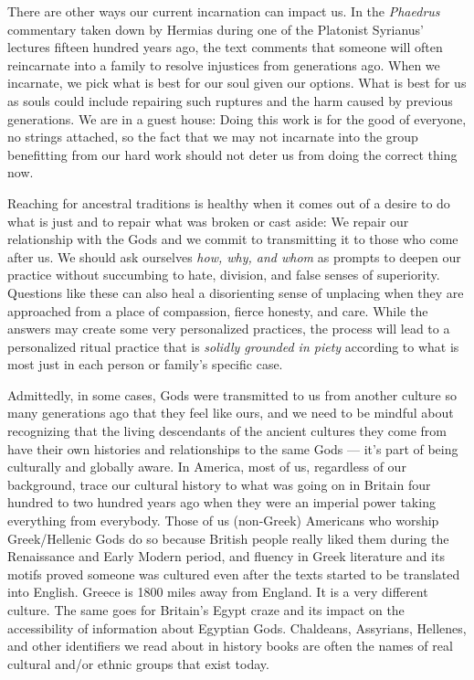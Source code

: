 \documentclass[
]{book}
\begin{document}
There are other ways our current incarnation can impact us. In the \emph{Phaedrus} commentary taken down by Hermias during one of the Platonist Syrianus' lectures fifteen hundred years ago, the text comments that someone will often reincarnate into a family to resolve injustices from generations ago. When we incarnate, we pick what is best for our soul given our options. What is best for us as souls could include repairing such ruptures and the harm caused by previous generations. We are in a guest house: Doing this work is for the good of everyone, no strings attached, so the fact that we may not incarnate into the group benefitting from our hard work should not deter us from doing the correct thing now.

Reaching for ancestral traditions is healthy when it comes out of a desire to do what is just and to repair what was broken or cast aside: We repair our relationship with the Gods and we commit to transmitting it to those who come after us. We should ask ourselves \emph{how, why, and whom} as prompts to deepen our practice without succumbing to hate, division, and false senses of superiority. Questions like these can also heal a disorienting sense of unplacing when they are approached from a place of compassion, fierce honesty, and care. While the answers may create some very personalized practices, the process will lead to a personalized ritual practice that is \emph{solidly grounded in piety} according to what is most just in each person or family's specific case.

Admittedly, in some cases, Gods were transmitted to us from another culture so many generations ago that they feel like ours, and we need to be mindful about recognizing that the living descendants of the ancient cultures they come from have their own histories and relationships to the same Gods --- it's part of being culturally and globally aware. In America, most of us, regardless of our background, trace our cultural history to what was going on in Britain four hundred to two hundred years ago when they were an imperial power taking everything from everybody. Those of us (non-Greek) Americans who worship Greek/Hellenic Gods do so because British people really liked them during the Renaissance and Early Modern period, and fluency in Greek literature and its motifs proved someone was cultured even after the texts started to be translated into English. Greece is 1800 miles away from England. It is a very different culture. The same goes for Britain's Egypt craze and its impact on the accessibility of information about Egyptian Gods. Chaldeans, Assyrians, Hellenes, and other identifiers we read about in history books are often the names of real cultural and/or ethnic groups that exist today.
\end{document}
